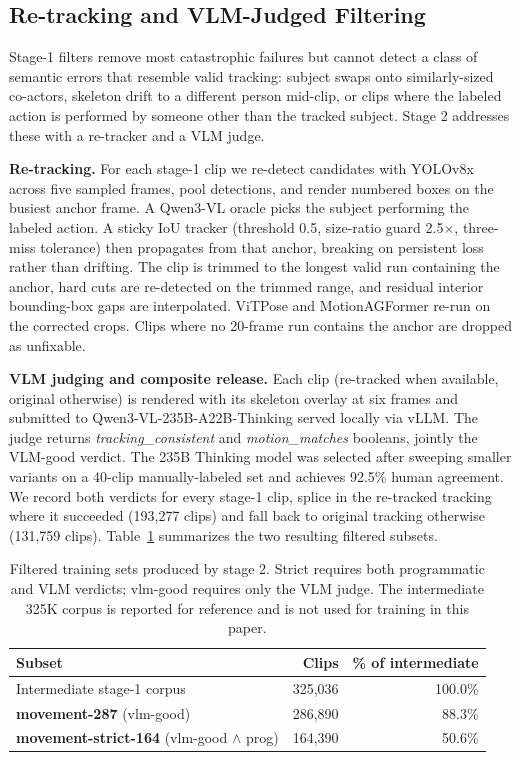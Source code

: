 \documentclass[letterpaper, 10pt, conference]{ieeeconf}
\begin{document}
\subsection{Re-tracking and VLM-Judged Filtering}
\label{sec:retracking}

Stage-1 filters remove most catastrophic failures but cannot detect a class of semantic errors that resemble valid tracking: subject swaps onto similarly-sized co-actors, skeleton drift to a different person mid-clip, or clips where the labeled action is performed by someone other than the tracked subject. Stage 2 addresses these with a re-tracker and a VLM judge.

\textbf{Re-tracking.} For each stage-1 clip we re-detect candidates with YOLOv8x across five sampled frames, pool detections, and render numbered boxes on the busiest anchor frame. A Qwen3-VL oracle picks the subject performing the labeled action. A sticky IoU tracker (threshold 0.5, size-ratio guard 2.5$\times$, three-miss tolerance) then propagates from that anchor, breaking on persistent loss rather than drifting. The clip is trimmed to the longest valid run containing the anchor, hard cuts are re-detected on the trimmed range, and residual interior bounding-box gaps are interpolated. ViTPose and MotionAGFormer re-run on the corrected crops. Clips where no 20-frame run contains the anchor are dropped as unfixable.

\textbf{VLM judging and composite release.} Each clip (re-tracked when available, original otherwise) is rendered with its skeleton overlay at six frames and submitted to Qwen3-VL-235B-A22B-Thinking served locally via vLLM. The judge returns \emph{tracking\_consistent} and \emph{motion\_matches} booleans, jointly the VLM-good verdict. The 235B Thinking model was selected after sweeping smaller variants on a 40-clip manually-labeled set and achieves 92.5\% human agreement. We record both verdicts for every stage-1 clip, splice in the re-tracked tracking where it succeeded (193,277 clips) and fall back to original tracking otherwise (131,759 clips). Table~\ref{tab:filtered} summarizes the two resulting filtered subsets.

\begin{table}[h]
\centering
\caption{Filtered training sets produced by stage 2. Strict requires both programmatic and VLM verdicts; vlm-good requires only the VLM judge. The intermediate 325K corpus is reported for reference and is not used for training in this paper.}
\label{tab:filtered}
\begin{tabular}{lrr}
\toprule
\textbf{Subset} & \textbf{Clips} & \textbf{\% of intermediate} \\
\midrule
Intermediate stage-1 corpus & 325{,}036 & 100.0\% \\
\textbf{movement-287} (vlm-good) & 286{,}890 & 88.3\% \\
\textbf{movement-strict-164} (vlm-good $\land$ prog) & 164{,}390 & 50.6\% \\
\bottomrule
\end{tabular}
\end{table}
\end{document}
